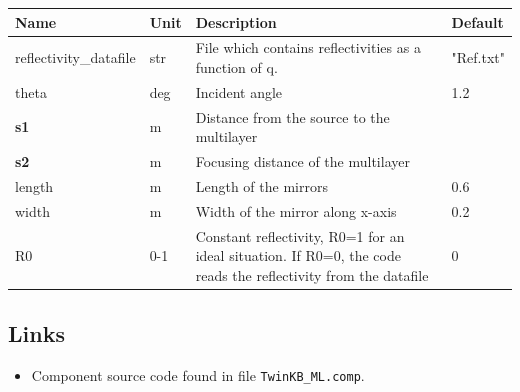 \begin{longtable}{p{}p{}p{}p{}}
\toprule
\textbf{Name} & \textbf{Unit} & \textbf{Description} & \textbf{Default} \\
\midrule
\endhead
reflectivity\_datafile & str & File which contains reflectivities as a function of q. & "Ref.txt" \\
theta & deg & Incident angle & 1.2 \\
\textbf{s1} & m & Distance from the source to the multilayer &  \\
\textbf{s2} & m & Focusing distance of the multilayer &  \\
length & m & Length of the mirrors & 0.6 \\
width & m & Width of the mirror along x-axis & 0.2 \\
R0 & 0-1 & Constant reflectivity, R0=1 for an ideal situation. If R0=0, the code reads the reflectivity from the datafile & 0 \\
\bottomrule
\end{longtable}

\subsection*{Links}
\begin{itemize}
  \item Component source code found in file \texttt{TwinKB\_ML.comp}.
\end{itemize}
